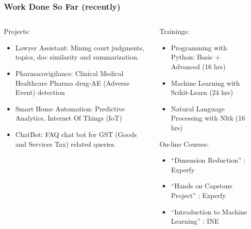 \begin{frame}[fragile]\frametitle{Work Done So Far (recently)}
\begin{columns}

    \begin{column}[T]{0.6\linewidth}
	Projects:
      \begin{itemize}
		\item Lawyer Assistant: Mining court judgments, topics, doc similarity and summarization.
		\item Pharmacovigilance: Clinical Medical Healthcare Pharma drug-AE (Adverse Event) detection
		\item Smart Home Automation: Predictive Analytics, Internet Of Things (IoT)
		\item ChatBot: FAQ chat bot for GST (Goods and Services Tax) related queries.
	  \end{itemize}

    \end{column}
    \begin{column}[T]{0.4\linewidth}
	Trainings:
      \begin{itemize}
		\item Programming with Python: Basic + Advanced (16 hrs)
		\item Machine Learning with Scikit-Learn (24 hrs)
		\item Natural Language Processing with Nltk (16 hrs)
	  \end{itemize}
	  On-line Courses:
      \begin{itemize}
		\item ``Dimension Reduction'' : Experfy
		\item ``Hands on Capstone Project'' : Experfy 
		\item ``Introduction to Machine Learning'' : INE
	  \end{itemize}	  
    \end{column}
  \end{columns}
\end{frame}




